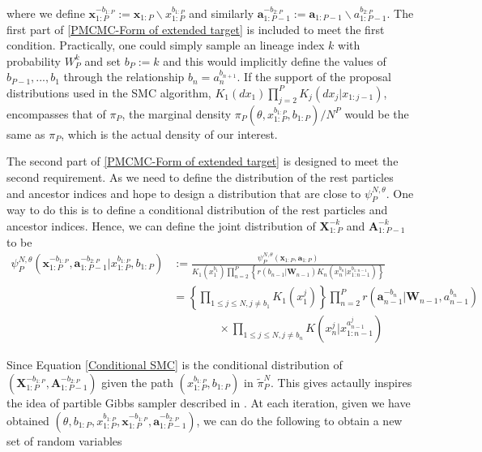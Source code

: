 \documentclass[12pt,a4paper]{article}
\begin{document}
where we define $\mathbf{x}_{1:P}^{-b_{1:P}} := \mathbf{x}_{1:P}\backslash x_{1:P}^{b_{1:P}}$ and similarly $\mathbf{a}_{1:P-1}^{-b_{2:P}} := \mathbf{a}_{1:P-1} \backslash a_{1:P-1}^{b_{2:P}}$. The first part of \eqref{PMCMC-Form of extended target} is included to meet the first condition. Practically, one could simply sample an lineage index $k$ with probability $W_P^k$ and set $b_P:=k$ and this would implicitly define the values of $b_{P-1},...,b_1$ through the relationship $b_n = a_n^{b_{n+1}}$. If the support of the proposal distributions used in the SMC algorithm, $K_1(dx_1)\prod_{j=2}^{P}K_j(dx_j|x_{1:j-1})$, encompasses that of $\pi_P$, the marginal density $\pi_P(\theta,x_{1:P}^{b_{1:P}},b_{1:P})/N^P$ would be the same as $\pi_P$, which is the actual density of our interest. 

The second part of \eqref{PMCMC-Form of extended target} is designed to meet the second requirement. As we need to define the distribution of the rest particles and ancestor indices and hope to design a distribution that are close to $\psi_P^{N,\theta}$. One way to do this is to define a conditional distribution of the rest particles and ancestor indices. Hence, we can define the joint distribution of $\textbf{X}_{1:P}^{-k}$ and $\textbf{A}_{1:P-1}^{-k}$ to be
\begin{equation}
    \label{Conditional SMC} 
    \begin{split}
        \psi_P^{N,\theta}\left(\mathbf{x}_{1:P}^{-b_{1:P}},\mathbf{a}_{1:P-1}^{-b_{2:P}}|x_{1:P}^{b_{1:P}},b_{1:P}\right) &:= \frac{\psi_P^{N,\theta}(\mathbf{x}_{1:P},\mathbf{a}_{1:P})}{K_1\left(x_1^{b_1}\right)\prod_{n=2}^P \left\{r\left(b_{n-1}|\mathbf{W}_{n-1}\right)K_n\left(x_n^{b_n}|x_{1:n-1}^{b_{1:n-1}}\right)\right\}}\\
        &= \left\{\prod_{1\leq j \leq N,j \neq b_1} K_1\left(x_1^j\right)\right\}\prod_{n=2}^P r\left(\mathbf{a}_{n-1}^{-b_{n}}|\mathbf{W}_{n-1},a_{n-1}^{b_n}\right) \\
        &\quad\quad\quad\quad \times \prod_{1 \leq j \leq N, j \neq b_n} K\left(x_n^j|x_{1:n-1}^{a_{n-1}^j}\right)
    \end{split}
\end{equation} 


Since Equation \eqref{Conditional SMC} is the conditional distribution of \(\left(\textbf{X}_{1:P}^{-b_{1:P}},\textbf{A}_{1:P-1}^{-b_{2:P}}\right)\) given the path \(\left(x_{1:P}^{b_{1:P}},b_{1:P}\right)\) in \(\tilde{\pi}_P^N\). This gives actaully inspires the idea of partible Gibbs sampler described in \cite{andrieu2010particle}. At each iteration, given we have obtained \(\left(\theta,b_{1:P},x_{1:P}^{b_{1:P}},\textbf{x}_{1:P}^{-b_{1:P}},\textbf{a}_{1:P-1}^{-b_{2:P}}\right)\), we can do the following to obtain a new set of random variables
\end{document}
